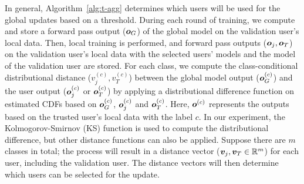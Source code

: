 \documentclass{article} %
\newcommand{\yli}[1]{{\color{cyan}#1}}
\begin{document}
\yli{In general, Algorithm~\ref{alg:t-agg} determines which users will be used for the global updates based on a threshold. During each round of training, we compute and store a forward pass output (${\bm{o}}_G$) of the global model on the validation user's local data. Then, local training is performed, and forward pass outputs (${\bm{o}}_j, {\bm{o}}_T$) on the validation user's local data with the selected users' models and the model of the validation user are stored. For each class, we compute the class-conditional distributional distance ($v^{(c)}_j, v^{(c)}_T$) between the global model output (${\bm{o}}^{(c)}_G$) and the user output (${\bm{o}}^{(c)}_j$ or ${\bm{o}}^{(c)}_T$) by applying a distributional difference function on estimated CDFs based on ${\bm{o}}^{(c)}_G$, ${\bm{o}}^{(c)}_j$ and ${\bm{o}}^{(c)}_T$. Here, ${\bm{o}}^{(c)}$ represents the outputs based on the trusted user's local data with the label $c$. In our experiment, the Kolmogorov-Smirnov (KS) function is used to compute the distributional difference, but other distance functions can also be applied. Suppose there are $m$ classes in total; the process will result in a distance vector (${\bm{v}}_j, {\bm{v}}_T\in{\mathbb{R}}^m$) for each user, including the validation user. The distance vectors will then determine which users can be selected for the update.}

%

\vspace{-.25cm}
\end{document}
